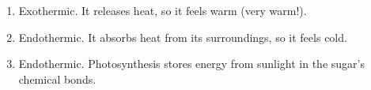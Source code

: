 \begin{Answer}[ref = exo_endo]
\begin{enumerate}
\item Exothermic. It releases heat, so it feels warm (very warm!).
\item Endothermic. It absorbs heat from its surroundings, so it feels cold.
\item Endothermic. Photosynthesis stores energy from sunlight in the sugar's chemical bonds.
\end{enumerate}
\end{Answer}

